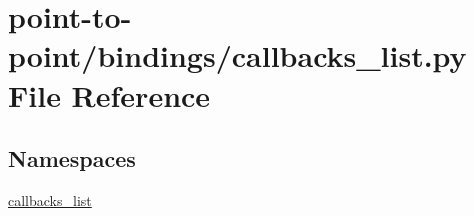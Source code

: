 \hypertarget{point-to-point_2bindings_2callbacks__list_8py}{}\section{point-\/to-\/point/bindings/callbacks\+\_\+list.py File Reference}
\label{point-to-point_2bindings_2callbacks__list_8py}
\subsection*{Namespaces}
\begin{DoxyCompactItemize}
\item 
 \hyperlink{namespacecallbacks__list}{callbacks\+\_\+list}
\end{DoxyCompactItemize}
